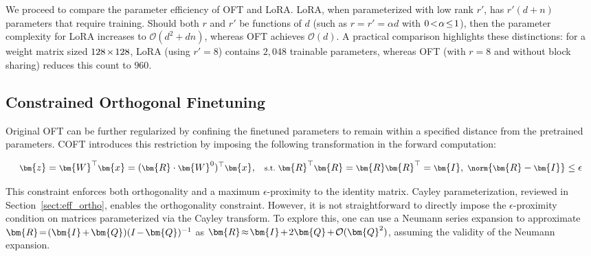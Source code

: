 We proceed to compare the parameter efficiency of OFT and LoRA. LoRA, when parameterized with low rank $r'$, has $r'(d+n)$ parameters that require training. Should both $r$ and $r'$ be functions of $d$ (such as $r=r'=\alpha d$ with $\thickmuskip=2mu \medmuskip=2mu 0<\alpha\leq 1$), then the parameter complexity for LoRA increases to $\mathcal{O}(d^2+dn)$, whereas OFT achieves $\mathcal{O}(d)$. A practical comparison highlights these distinctions: for a weight matrix sized $\thickmuskip=2mu \medmuskip=2mu 128\times 128$, LoRA (using $r'=8$) contains $2,048$ trainable parameters, whereas OFT (with $r=8$ and without block sharing) reduces this count to $960$.

\subsection{Constrained Orthogonal Finetuning}

Original OFT can be further regularized by confining the finetuned parameters to remain within a specified distance from the pretrained parameters. COFT introduces this restriction by imposing the following transformation in the forward computation:

\begin{equation}\label{eq:coft_general}
    \footnotesize
    \bm{z}=\bm{W}^\top\bm{x}=(\bm{R}\cdot\bm{W}^0)^\top\bm{x},~~~\text{s.t.}~\bm{R}^\top\bm{R}=\bm{R}\bm{R}^\top=\bm{I},~\norm{\bm{R}-\bm{I}}\leq \epsilon
\end{equation}

This constraint enforces both orthogonality and a maximum $\epsilon$-proximity to the identity matrix. Cayley parameterization, reviewed in Section~\ref{sect:eff_ortho}, enables the orthogonality constraint. However, it is not straightforward to directly impose the $\epsilon$-proximity condition on matrices parameterized via the Cayley transform. To explore this, one can use a Neumann series expansion to approximate $\thickmuskip=2mu \medmuskip=2mu \bm{R}=(\bm{I}+\bm{Q})(I-\bm{Q})^{-1}$ as $\thickmuskip=2mu \medmuskip=2mu \bm{R}\approx\bm{I}+2\bm{Q}+\mathcal{O}(\bm{Q}^2)$, assuming the validity of the Neumann expansion.

